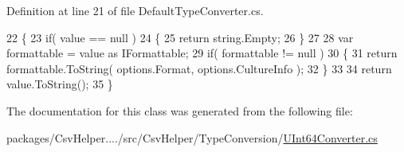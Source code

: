 Definition at line 21 of file Default\-Type\-Converter.\-cs.


\begin{DoxyCode}
22         \{
23             \textcolor{keywordflow}{if}( value == null )
24             \{
25                 \textcolor{keywordflow}{return} string.Empty;
26             \}
27 
28             var formattable = value as IFormattable;
29             \textcolor{keywordflow}{if}( formattable != null )
30             \{
31                 \textcolor{keywordflow}{return} formattable.ToString( options.Format, options.CultureInfo );
32             \}
33 
34             \textcolor{keywordflow}{return} value.ToString();
35         \}
\end{DoxyCode}


The documentation for this class was generated from the following file\-:\begin{DoxyCompactItemize}
\item 
packages/\-Csv\-Helper..../src/\-Csv\-Helper/\-Type\-Conversion/\hyperlink{a00289}{U\-Int64\-Converter.\-cs}\end{DoxyCompactItemize}
